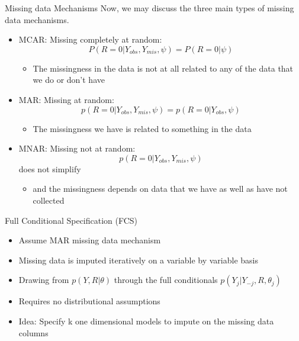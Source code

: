 \begin{frame}{Missing data Mechanisms}
Now, we may discuss the three main types of missing data mechanisms. 
\begin{itemize}

\item MCAR: Missing completely at random:  $$P(R=0|Y_{obs},Y_{mis},\psi)=P(R=0|\psi)$$
\begin{itemize}
\item The missingness in the data is not at all related to any of the data that we do or don't have
\end{itemize}
\item MAR: Missing at random: $$p(R=0|Y_{obs},Y_{mis},\psi)= p(R=0|Y_{obs},\psi)$$
\begin{itemize}
 \item The missingness we have is related to something in the data 
\end{itemize}
\item MNAR: Missing not at random: $$p(R=0|Y_{obs},Y_{mis},\psi)$$ does not simplify
\begin{itemize}
 \item  and the missingness depends on data that we have as well as have not collected
\end{itemize}


\end{itemize}
 
\end{frame}


\begin{frame}{Full Conditional Specification (FCS)}
 \begin{itemize}
  \item Assume MAR missing data mechanism %
  \item Missing data is imputed iteratively on a variable by variable basis
  \item Drawing from $p(Y,R|\theta)$ through the full conditionals $p(Y_j|Y_{-j},R,\theta_j)$
  \item Requires no distributional assumptions
  \item Idea: Specify k one dimensional models to impute on the missing data columns
 \end{itemize}

\end{frame}

